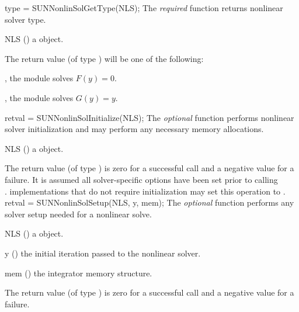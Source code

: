 {
  type = SUNNonlinSolGetType(NLS);
}
{
  The \textit{required} function  returns
  nonlinear solver type.
}
{
  \begin{args}[NLS]
  \item[NLS] ()
    a {\sunnonlinsol} object.
  \end{args}
}
{
  The return value  (of type ) will be one of the
  following:
  \begin{args}
  \item[\Id{SUNNONLINEARSOLVER\_ROOTFIND}]
    , the {\sunnonlinsol} module solves $F(y) = 0$.
  \item[\Id{SUNNONLINEARSOLVER\_FIXEDPOINT}]
    , the {\sunnonlinsol} module solves $G(y) = y$.
  \end{args}
}
{}
{
  retval = SUNNonlinSolInitialize(NLS);
}
{
  The \textit{optional} function  performs
  nonlinear solver initialization and may perform any necessary memory
  allocations.
}
{
  \begin{args}[NLS]
  \item[NLS] ()
    a {\sunnonlinsol} object.
  \end{args}
}
{
  The return value  (of type ) is zero for a
  successful call and a negative value for a failure.
}
{
  It is assumed all solver-specific options have been set prior to
  calling \\ \noindent
  . {\sunnonlinsol} implementations
  that do not require initialization may set this operation
  to .
}
{
  retval = SUNNonlinSolSetup(NLS, y, mem);
}
{
  The \textit{optional} function  performs any
  solver setup needed for a nonlinear solve.
}
{
  \begin{args}[NLS]
  \item[NLS] ()
    a {\sunnonlinsol} object.
  \item[y] ()
    the initial iteration passed to the nonlinear solver.
  \item[mem] ()
    the {\sundials} integrator memory structure.
  \end{args}
}
{
  The return value  (of type ) is zero for a
  successful call and a negative value for a failure.
}
